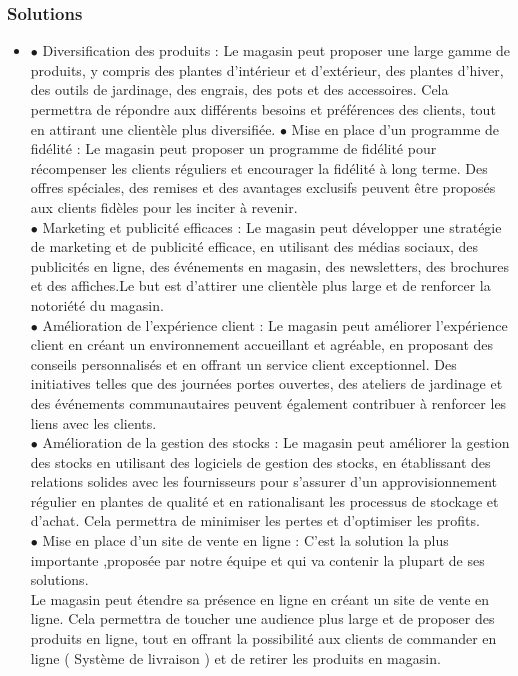 \documentclass[a4paper,12pt,oneside]{article}
\begin{document}
\subsubsection{Solutions}
		\begin{itemize}
        \item[]
       	 $\bullet$ Diversification des produits : Le magasin peut
proposer une large gamme de produits, y
compris des plantes d'intérieur et d'extérieur,
des plantes d'hiver, des outils de jardinage, des
engrais, des pots et des accessoires. Cela
permettra de répondre aux différents besoins
et préférences des clients, tout en attirant une
clientèle plus diversifiée.
\vskip1mm
       	 $\bullet$ Mise en place d'un programme de fidélité : Le
magasin peut proposer un programme de
fidélité pour récompenser les clients réguliers
et encourager la fidélité à long terme. Des
offres spéciales, des remises et des avantages
exclusifs peuvent être proposés aux clients
fidèles pour les inciter à revenir.\\
\vskip1mm
       	 $\bullet$ Marketing et publicité efficaces : Le magasin
peut développer une stratégie de marketing et
de publicité efficace, en utilisant des médias
sociaux, des publicités en ligne, des
événements en magasin, des newsletters, des
brochures et des affiches.Le but est d'attirer une clientèle plus large et de renforcer la notoriété du magasin.\\
\vskip1mm
    		$\bullet$ Amélioration de l'expérience client : Le magasin
peut améliorer l'expérience client en créant un
environnement accueillant et agréable, en
proposant des conseils personnalisés et en
offrant un service client exceptionnel. Des
initiatives telles que des journées portes
ouvertes, des ateliers de jardinage et des
événements communautaires peuvent
également contribuer à renforcer les liens avec
les clients. \\
\vskip1mm
    		$\bullet$ Amélioration de la gestion des stocks : Le
magasin peut améliorer la gestion des stocks
en utilisant des logiciels de gestion des stocks,
en établissant des relations solides avec les
fournisseurs pour s'assurer d'un
approvisionnement régulier en plantes de
qualité et en rationalisant les processus de
stockage et d'achat. Cela permettra de
minimiser les pertes et d'optimiser les profits.\\
\vskip1mm
    		$\bullet$ Mise en place d'un site de vente en ligne : C'est
la solution la plus importante ,proposée par
notre équipe et qui va contenir la plupart de
ses solutions.\\
\vskip1mm
\hspace{1cm}Le magasin peut étendre sa présence en ligne en
créant un site de vente en ligne. Cela permettra de
toucher une audience plus large et de proposer des
produits en ligne, tout en offrant la possibilité aux
clients de commander en ligne ( Système de
livraison ) et de retirer les produits en magasin.
    		
    		\end{itemize}
\vskip1mm
\end{document}
